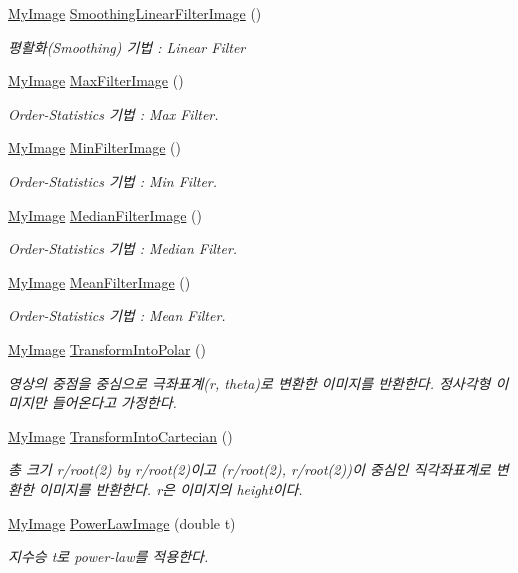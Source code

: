 \begin{DoxyCompactItemize}
\hyperlink{class_my_image}{My\-Image} \hyperlink{class_my_image_ad7944b144f9744e17051878b4b50c951}{Smoothing\-Linear\-Filter\-Image} ()
\begin{DoxyCompactList}\small\item\em 평활화(\-Smoothing) 기법 \-: Linear Filter \end{DoxyCompactList}\item 
\hyperlink{class_my_image}{My\-Image} \hyperlink{class_my_image_a9c679fe0d1c067a40297ac805b02bfad}{Max\-Filter\-Image} ()
\begin{DoxyCompactList}\small\item\em Order-\/\-Statistics 기법 \-: Max Filter. \end{DoxyCompactList}\item 
\hyperlink{class_my_image}{My\-Image} \hyperlink{class_my_image_a258d1539f4841dd0c9f4453cd4b84b16}{Min\-Filter\-Image} ()
\begin{DoxyCompactList}\small\item\em Order-\/\-Statistics 기법 \-: Min Filter. \end{DoxyCompactList}\item 
\hyperlink{class_my_image}{My\-Image} \hyperlink{class_my_image_a642496d4037beaf9da663b8d1ad783d9}{Median\-Filter\-Image} ()
\begin{DoxyCompactList}\small\item\em Order-\/\-Statistics 기법 \-: Median Filter. \end{DoxyCompactList}\item 
\hyperlink{class_my_image}{My\-Image} \hyperlink{class_my_image_a2351ec80136c2ef0e44564443bcd95d6}{Mean\-Filter\-Image} ()
\begin{DoxyCompactList}\small\item\em Order-\/\-Statistics 기법 \-: Mean Filter. \end{DoxyCompactList}\item 
\hyperlink{class_my_image}{My\-Image} \hyperlink{class_my_image_a0bf6e1069067a1e6ac8d9fb6f9e4e16e}{Transform\-Into\-Polar} ()
\begin{DoxyCompactList}\small\item\em 영상의 중점을 중심으로 극좌표계(r, theta)로 변환한 이미지를 반환한다. 정사각형 이미지만 들어온다고 가정한다. \end{DoxyCompactList}\item 
\hyperlink{class_my_image}{My\-Image} \hyperlink{class_my_image_aa53e9b0fa696a4de66da49b13b9afd48}{Transform\-Into\-Cartecian} ()
\begin{DoxyCompactList}\small\item\em 총 크기 r/root(2) by r/root(2)이고 (r/root(2), r/root(2))이 중심인 직각좌표계로 변환한 이미지를 반환한다. r은 이미지의 height이다. \end{DoxyCompactList}\item 
\hyperlink{class_my_image}{My\-Image} \hyperlink{class_my_image_aaaab34952da21ff0590b583b72ecc8cb}{Power\-Law\-Image} (double t)
\begin{DoxyCompactList}\small\item\em 지수승 t로 power-\/law를 적용한다. \end{DoxyCompactList}\end{DoxyCompactItemize}
